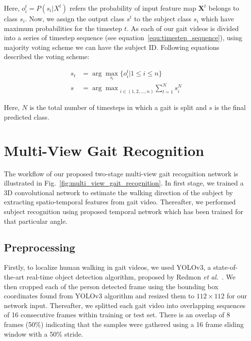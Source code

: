 Here, $o_i^t = P(s_i | X^t)$ refers the probability of input feature map $\boldsymbol X^t$ belongs to class $s_i$. Now, we assign the output class $s^t$ to the subject class $s_i$ which have maximum probabilities for the timestep $t$. As each of our gait videos is divided into a series of timestep sequence (see equation~\ref{equ:timestep_sequence}), using majority voting scheme we can have the subject ID. Following equations described the voting scheme:

\begin{equation}
\label{equ:predicted_class}
\begin{split}
s_t &=  \arg\max_{s_i}{\{o_i^t | 1 \leq i \leq n\}} \\
s &= {\arg\max}_{i\in(1, 2, ...,n)}{\sum_{t=1}^{N}s_i^N}
\end{split}
\end{equation}

Here, $ N $ is the total number of timesteps in which a gait is split and $ s $ is the final predicted class.  



\section{Multi-View Gait Recognition}
The workflow of our proposed two-stage multi-view gait recognition network is illustrated in Fig.~\ref{fig:multi_view_gait_recognition}. In first stage, we trained a 3D convolutional network to estimate the walking direction of the subject by extracting spatio-temporal features from gait video. Thereafter, we performed subject recognition using proposed temporal network which has been trained for that particular angle.


\subsection{Preprocessing}
Firstly, to localize human walking in gait videos, we used YOLOv3, a state-of-the-art real-time object detection algorithm, proposed by Redmon \textit{et al.}~\cite{Redmon_18}. We then cropped each of the person detected frame using the bounding box coordinates found from YOLOv3 algorithm and resized them to $112\times112$ for our network input. Thereafter, we splitted each gait video into overlapping sequences of 16 consecutive frames within training or test set. There is an overlap of 8 frames (50\%) indicating that the samples were gathered using a 16 frame sliding window with a 50\% stride.


